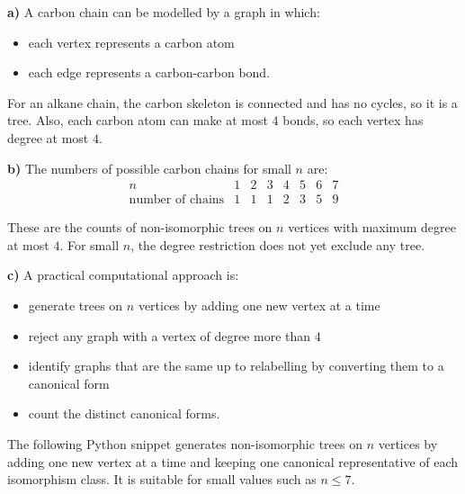 \begin{solution}
\textbf{a)} A carbon chain can be modelled by a graph in which:
\begin{itemize}[leftmargin=*]
  \item each vertex represents a carbon atom
  \item each edge represents a carbon-carbon bond.
\end{itemize}

For an alkane chain, the carbon skeleton is connected and has no cycles, so it is a tree. Also, each carbon atom can make at most $4$ bonds, so each vertex has degree at most $4$.

\textbf{b)} The numbers of possible carbon chains for small $n$ are:
\[
\begin{array}{c|ccccccc}
n & 1 & 2 & 3 & 4 & 5 & 6 & 7\\ \hline
\text{number of chains} & 1 & 1 & 1 & 2 & 3 & 5 & 9
\end{array}
\]

These are the counts of non-isomorphic trees on $n$ vertices with maximum degree at most $4$. For small $n$, the degree restriction does not yet exclude any tree.

\textbf{c)} A practical computational approach is:
\begin{itemize}[leftmargin=*]
  \item generate trees on $n$ vertices by adding one new vertex at a time
  \item reject any graph with a vertex of degree more than $4$
  \item identify graphs that are the same up to relabelling by converting them to a canonical form
  \item count the distinct canonical forms.
\end{itemize}
\end{solution}

\begin{remark}
The following Python snippet generates non-isomorphic trees on $n$ vertices by adding one new vertex at a time and keeping one canonical representative of each isomorphism class. It is suitable for small values such as $n\le 7$.
\end{remark}

